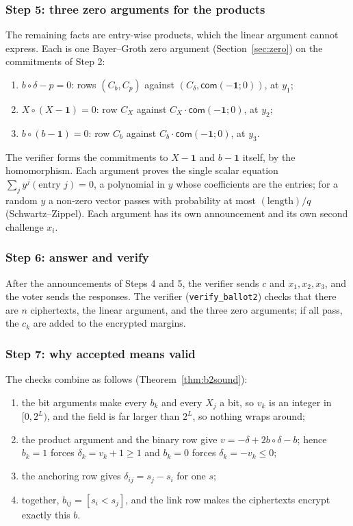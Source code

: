 \documentclass[11pt,a4paper]{article}
\newcommand{\com}{\mathsf{com}}
\newcommand{\rocq}[1]{\texttt{#1}}
\theoremstyle{remark}
\begin{document}
\subsubsection*{Step 5: three zero arguments for the products}
The remaining facts are entry-wise products, which the linear argument
cannot express. Each is one Bayer--Groth zero argument
(Section~\ref{sec:zero}) on the commitments of Step 2:
\begin{enumerate}[nosep]
  \item $b \circ \delta - p = 0$: rows $(C_b, C_p)$ against $(C_\delta,
  \com(-\mathbf{1}; 0))$, at $y_1$;
  \item $X \circ (X - \mathbf{1}) = 0$: row $C_X$ against $C_X \cdot
  \com(-\mathbf{1}; 0)$, at $y_2$;
  \item $b \circ (b - \mathbf{1}) = 0$: row $C_b$ against $C_b \cdot
  \com(-\mathbf{1}; 0)$, at $y_3$.
\end{enumerate}
The verifier forms the commitments to $X - \mathbf{1}$ and $b - \mathbf{1}$
itself, by the homomorphism. Each argument proves the single scalar
equation $\sum_j y^{j} (\text{entry } j) = 0$, a polynomial in $y$ whose
coefficients are the entries; for a random $y$ a non-zero vector passes
with probability at most $(\text{length})/q$ (Schwartz--Zippel). Each
argument has its own announcement and its own second challenge $x_i$.

\subsubsection*{Step 6: answer and verify}
After the announcements of Steps 4 and 5, the verifier sends $c$ and $x_1,
x_2, x_3$, and the voter sends the responses. The verifier
(\rocq{verify\_ballot2}) checks that there are $n$ ciphertexts, the linear
argument, and the three zero arguments; if all pass, the $c_k$ are added
to the encrypted margins.

\subsubsection*{Step 7: why accepted means valid}
The checks combine as follows (Theorem~\ref{thm:b2sound}):
\begin{enumerate}[nosep]
  \item the bit arguments make every $b_k$ and every $X_j$ a bit, so $v_k$
  is an integer in $[0, 2^{L})$, and the field is far larger than $2^{L}$,
  so nothing wraps around;
  \item the product argument and the binary row give $v = -\delta + 2 b
  \circ \delta - b$; hence $b_k = 1$ forces $\delta_k = v_k + 1 \ge 1$ and
  $b_k = 0$ forces $\delta_k = -v_k \le 0$;
  \item the anchoring row gives $\delta_{ij} = s_j - s_i$ for one $s$;
  \item together, $b_{ij} = [s_i < s_j]$, and the link row makes the
  ciphertexts encrypt exactly this $b$.
\end{enumerate}
\end{document}
